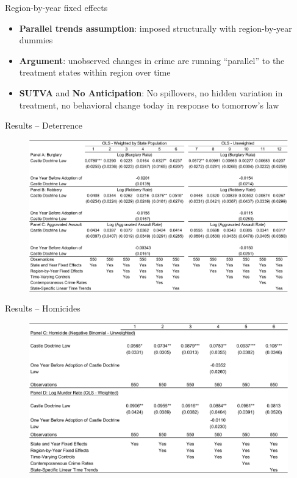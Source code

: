 \documentclass{beamer}
\begin{document}
\begin{frame}{Region-by-year fixed effects}
	
	\begin{itemize}
	\item \textbf{Parallel trends assumption}: imposed structurally with region-by-year dummies
	\item \textbf{Argument}: unobserved changes in crime are running ``parallel'' to the treatment states within region over time
	\item \textbf{SUTVA} and \textbf{No Anticipation}: No spillovers, no hidden variation in treatment, no behavioral change today in response to tomorrow's law
	\end{itemize}
\end{frame}



\begin{frame}{Results -- Deterrence}
	
	\begin{figure}
	\includegraphics[scale=0.4]{./lecture_includes/cheng4.pdf}
	\end{figure}
\end{frame}




\begin{frame}{Results -- Homicides}
	
	\begin{figure}
	\includegraphics[scale=0.4]{./lecture_includes/cheng12.pdf}
	\end{figure}
\end{frame}
\end{document}
